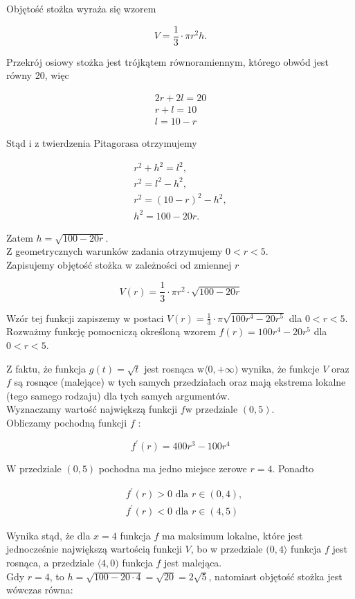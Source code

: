 \documentclass[10pt]{article}
\begin{document}
Objętość stożka wyraża się wzorem

$$
V=\frac{1}{3} \cdot \pi r^{2} h .
$$

Przekrój osiowy stożka jest trójkątem równoramiennym, którego obwód jest równy 20, więc

$$
\begin{gathered}
2 r+2 l=20 \\
r+l=10 \\
l=10-r
\end{gathered}
$$

Stąd i z twierdzenia Pitagorasa otrzymujemy

$$
\begin{gathered}
r^{2}+h^{2}=l^{2}, \\
r^{2}=l^{2}-h^{2}, \\
r^{2}=(10-r)^{2}-h^{2}, \\
h^{2}=100-20 r .
\end{gathered}
$$

Zatem $h=\sqrt{100-20 r}$.\\
Z geometrycznych warunków zadania otrzymujemy $0<r<5$.\\
Zapisujemy objętość stożka w zależności od zmiennej $r$

$$
V(r)=\frac{1}{3} \cdot \pi r^{2} \cdot \sqrt{100-20 r}
$$

Wzór tej funkcji zapiszemy w postaci $V(r)=\frac{1}{3} \cdot \pi \sqrt{100 r^{4}-20 r^{5}}$ dla $0<r<5$.\\
Rozważmy funkcję pomocniczą określoną wzorem $f(r)=100 r^{4}-20 r^{5}$ dla $0<r<5$.

Z faktu, że funkcja $g(t)=\sqrt{t}$ jest rosnąca $\mathrm{w}\langle 0,+\infty)$ wynika, że funkcje $V$ oraz $f$ są rosnące (malejące) w tych samych przedziałach oraz mają ekstrema lokalne (tego samego rodzaju) dla tych samych argumentów.\\
Wyznaczamy wartość największą funkcji $f \mathrm{w}$ przedziale $(0,5)$.\\
Obliczamy pochodną funkcji $f$ :

$$
f^{\prime}(r)=400 r^{3}-100 r^{4}
$$

W przedziale $(0,5)$ pochodna ma jedno miejsce zerowe $r=4$. Ponadto

$$
\begin{aligned}
& f^{\prime}(r)>0 \text { dla } r \in(0,4), \\
& f^{\prime}(r)<0 \text { dla } r \in(4,5)
\end{aligned}
$$

Wynika stąd, że dla $x=4$ funkcja $f$ ma maksimum lokalne, które jest jednocześnie największą wartością funkcji $V$, bo w przedziale $(0,4\rangle$ funkcja $f$ jest rosnąca, a przedziale $\langle 4,0)$ funkcja $f$ jest malejąca.\\
Gdy $r=4$, to $h=\sqrt{100-20 \cdot 4}=\sqrt{20}=2 \sqrt{5}$, natomiast objętość stożka jest wówczas równa:
\end{document}
